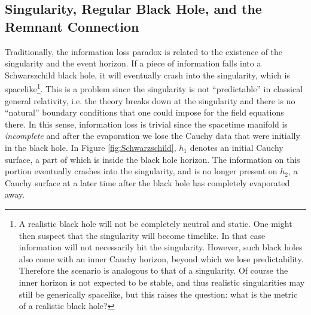 \documentclass[12pt]{article}
\newcommand{\2}{$^2$}
\newcommand{\3}{$^3$}
\newcommand{\4}{$_4$}
\newcommand{\5}{$_5$}
\begin{document}
\subsection{Singularity, Regular Black Hole, and the Remnant Connection}\label{regular}

Traditionally, the information loss paradox is related to the existence of the singularity and the event horizon. If a piece of information falls into a Schwarszchild black hole, it will eventually crash into the singularity, which is spacelike\footnote{\color{black}A realistic black hole will not be completely neutral and static. One might then suspect that the singularity will become timelike. In that case information will not necessarily hit the singularity. However, such black holes also come with an inner Cauchy horizon, beyond which we lose predictability. Therefore the scenario is analogous to that of a singularity. Of course the inner horizon is not expected to be stable, and thus realistic singularities may still be generically spacelike, but this raises the question: what is the metric of a realistic black hole?}. This is a problem since the singularity is not ``predictable'' in classical general relativity, i.e. the theory breaks down at the singularity and there is no ``natural'' boundary conditions that one could impose for the field equations there. In this sense, information loss is trivial since the spacetime manifold is \emph{incomplete} and after the evaporation we lose the Cauchy data that were initially in the black hole. In Figure \ref{fig:Schwarzschild}, $h_1$ denotes an initial Cauchy surface, a part of which is inside the black hole horizon. The information on this portion eventually crashes into the singularity, and is no longer present on $h_2$, a Cauchy surface at a later time after the black hole has completely evaporated away.
\end{document}
